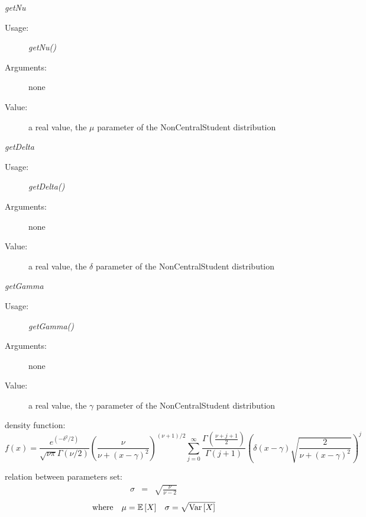 \begin{description}
\begin{description}
\item \textit{getNu}
\begin{description}
\item[Usage:] \textit{getNu()}
\item[Arguments:] none
\item[Value:]  a real value,  the $\mu$ parameter of the NonCentralStudent distribution
\end{description}
\bigskip
\item \textit{getDelta}
\begin{description}
\item[Usage:] \textit{getDelta()}
\item[Arguments:] none
\item[Value:]  a real value,  the $\delta$ parameter of the NonCentralStudent distribution
\end{description}
\bigskip
\item \textit{getGamma}
\begin{description}
\item[Usage:] \textit{getGamma()}
\item[Arguments:] none
\item[Value:]  a real value,  the $\gamma$ parameter of the NonCentralStudent distribution
\end{description}
\bigskip
\end{description}

\item[Details:]  \rule{0pt}{1em}
\begin{description}
\item density function:
\begin{equation}
f(x) =\frac{e^{(-\delta^2 / 2)}}{\sqrt{\nu\pi} \Gamma(\nu / 2)}\left(\frac{\nu}{\nu + (x-\gamma)^2}\right) ^ {(\nu + 1) / 2} \sum_{j=0}^{\infty} \frac{\Gamma\left(\frac{\nu + j + 1}{2}\right)}{\Gamma(j + 1)}\left(\delta(x-\gamma)\sqrt{\frac{2}{\nu + (x-\gamma)^2}}\right) ^ j
\end{equation}
\item relation between parameters set:
\begin{eqnarray*}
\sigma            &  =    &       \sqrt{\frac{\nu}{\nu-2} }
\end{eqnarray*}
\begin{align*}
\mbox{where}
&&
\mu = {\mathbb E}\left[ X \right]
&&
\sigma = \sqrt{{\rm Var}\left[ X \right] }
\end{align*}
\end{description}

\item[Links:]  \rule{0pt}{1em}
\end{description}


